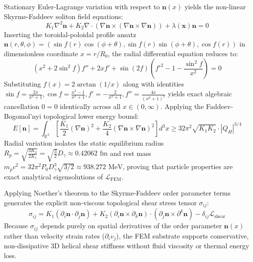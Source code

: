 \documentclass[11pt,a4paper]{article}
\begin{document}
	Stationary Euler-Lagrange variation with respect to $\mathbf{n}(x)$ yields the non-linear Skyrme-Faddeev soliton field equations:
	\begin{equation}
		K_1 \nabla^2 \mathbf{n} + K_2 \nabla \cdot (\nabla \mathbf{n} \times (\nabla \mathbf{n} \times \nabla \mathbf{n})) + \lambda(\mathbf{x}) \mathbf{n} = 0
	\end{equation}
	Inserting the toroidal-poloidal profile ansatz $\mathbf{n}(r, \theta, \phi) = \left(\sin f(r)\cos(\phi+\theta), \sin f(r)\sin(\phi+\theta), \cos f(r)\right)$ in dimensionless coordinate $x = r/R_0$, the radial differential equation reduces to:
	\begin{equation}
		\left( x^2 + 2\sin^2 f \right) f'' + 2x f' + \sin(2f) \left( f'^2 - 1 - \frac{\sin^2 f}{x^2} \right) = 0
	\end{equation}
	Substituting $f(x) = 2\arctan(1/x)$ along with identities $\sin f = \frac{2x}{x^2+1}, \cos f = \frac{x^2-1}{x^2+1}, f' = -\frac{2}{x^2+1}, f'' = \frac{4x}{(x^2+1)^2}$ yields exact algebraic cancellation $0 = 0$ identically across all $x \in (0, \infty)$. Applying the Faddeev-Bogomol'nyi topological lower energy bound:
	\begin{equation}
		E[\mathbf{n}] = \int_{\mathbb{R}^3} \left[ \frac{K_1}{2} (\nabla \mathbf{n})^2 + \frac{K_2}{4} (\nabla \mathbf{n} \times \nabla \mathbf{n})^2 \right] d^3x \ge 32\pi^2 \sqrt{K_1 K_2} \cdot |Q_H|^{3/4}
	\end{equation}
	Radial variation isolates the static equilibrium radius $R_p = \sqrt{\frac{3 K_2}{2 K_1}} = \sqrt{\frac{3}{2}} D_\gamma \approx 0.42062\text{ fm}$ and rest mass $m_p c^2 = 32\pi^2 P_0 D_\gamma^3 \sqrt{3/2} \approx 938.272\text{ MeV}$, proving that particle properties are exact analytical eigensolutions of $\mathcal{L}_{\text{FEM}}$.
	
	Applying Noether's theorem to the Skyrme-Faddeev order parameter terms generates the explicit non-viscous topological shear stress tensor $\sigma_{ij}$:
	\begin{equation}
		\sigma_{ij} = K_1 (\partial_i \mathbf{n} \cdot \partial_j \mathbf{n}) + K_2 (\partial_i \mathbf{n} \times \partial_k \mathbf{n}) \cdot (\partial_j \mathbf{n} \times \partial^k \mathbf{n}) - \delta_{ij} \mathcal{L}_{\text{shear}}
	\end{equation}
	Because $\sigma_{ij}$ depends purely on spatial derivatives of the order parameter $\mathbf{n}(x)$ rather than velocity strain rates ($\partial_i v_j$), the FEM substrate supports conservative, non-dissipative 3D helical shear stiffness without fluid viscosity or thermal energy loss.
	
\end{document}
